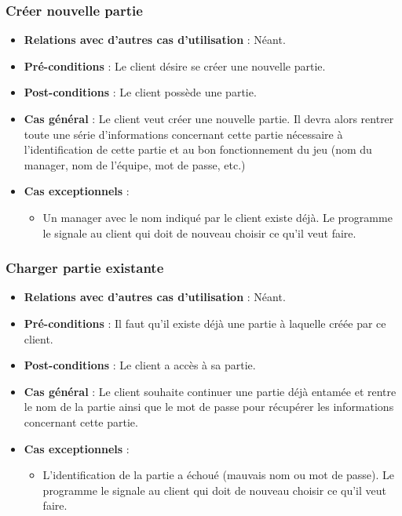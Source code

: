 \documentclass[a4paper,titlepage]{scrreprt}
\begin{document}
    \subsubsection{Créer nouvelle partie}
      \begin{itemize}
        \item \textbf{Relations avec d'autres cas d'utilisation}  : Néant.
        \item \textbf{Pré-conditions} : Le client désire se créer une nouvelle partie.
        \item \textbf{Post-conditions} : Le client possède une partie.
        \item \textbf{Cas général} : Le client veut créer une nouvelle partie. Il devra alors rentrer toute une série d’informations concernant cette partie nécessaire à l’identification de cette partie et au bon fonctionnement du jeu (nom du manager, nom de l’équipe, mot de passe, etc.)
        \item \textbf{Cas exceptionnels} :
          \begin{itemize}
            \item Un manager avec le nom indiqué par le client existe déjà. Le programme le signale au client qui doit de nouveau choisir ce qu'il veut faire.
          \end{itemize}
      \end{itemize}

    \subsubsection{Charger partie existante}
      \begin{itemize}
        \item \textbf{Relations avec d'autres cas d'utilisation}  : Néant.
        \item \textbf{Pré-conditions} : Il faut qu’il existe déjà une partie à laquelle créée par ce client.
        \item \textbf{Post-conditions} : Le client a accès à sa partie.
        \item \textbf{Cas général} : Le client souhaite continuer une partie déjà entamée et rentre le nom de la partie ainsi que le mot de passe pour récupérer les informations concernant cette partie.
        \item \textbf{Cas exceptionnels} :
          \begin{itemize}
      \item L’identification de la partie a échoué (mauvais nom ou mot de passe). Le programme le signale au client qui doit de nouveau choisir ce qu'il veut faire.
          \end{itemize}
      \end{itemize}
\end{document}
